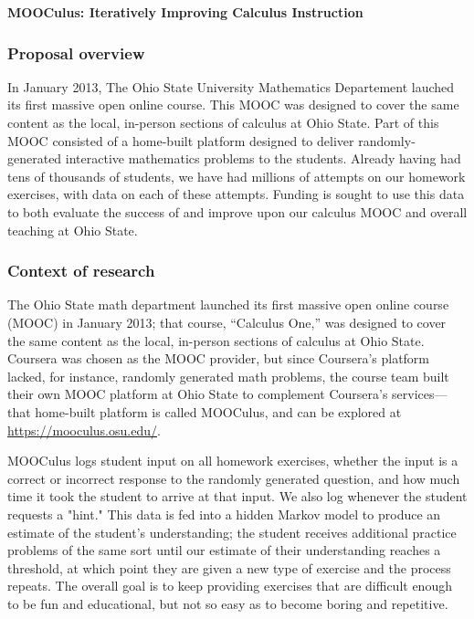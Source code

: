 \documentclass[12pt]{article}
\begin{document}
\begin{center}
  \textbf{MOOCulus: Iteratively Improving Calculus Instruction}
\end{center}

\subsubsection*{Proposal overview}

In January 2013, The Ohio State University Mathematics Departement
lauched its first massive open online course. This MOOC was designed
to cover the same content as the local, in-person sections of calculus
at Ohio State. Part of this MOOC consisted of a home-built platform
designed to deliver randomly-generated interactive mathematics
problems to the students. Already having had tens of thousands of
students, we have had millions of attempts on our homework exercises,
with data on each of these attempts.  Funding is sought to use this
data to both evaluate the success of and improve upon our calculus
MOOC and overall teaching at Ohio State.


\subsubsection*{Context of research}

The Ohio State math department launched its first massive open online
course (MOOC) in January 2013; that course, ``Calculus One,'' was
designed to cover the same content as the local, in-person sections of
calculus at Ohio State.  Coursera was chosen as the MOOC provider, but
since Coursera's platform lacked, for instance, randomly generated
math problems, the course team built their own MOOC platform at Ohio
State to complement Coursera's services---that home-built platform is
called MOOCulus, and can be explored at
\url{https://mooculus.osu.edu/}.

MOOCulus logs student input on all homework exercises, whether the
input is a correct or incorrect response to the randomly generated
question, and how much time it took the student to arrive at that
input.  We also log whenever the student requests a "hint."  This data
is fed into a hidden Markov model to produce an estimate of the
student's understanding; the student receives additional practice
problems of the same sort until our estimate of their understanding
reaches a threshold, at which point they are given a new type of
exercise and the process repeats.  The overall goal is to keep
providing exercises that are difficult enough to be fun and
educational, but not so easy as to become boring and repetitive.
\end{document}
